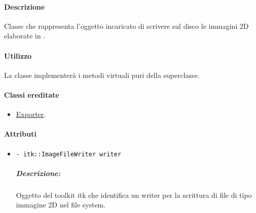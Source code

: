 \paragraph{Descrizione \\}
Classe che rappresenta l'oggetto incaricato di scrivere sul disco le immagini 2D elaborate in \project.
\paragraph{Utilizzo\\}
La classe implementerà i metodi virtuali puri della superclasse.
\paragraph{Classi ereditate\\}
\begin{itemize}
\item \hyperref[spexporter]{Exporter}.
\end{itemize}
\paragraph{\color{black}Attributi \\}
	\begin{itemize}
		\item \color{teal}\verb!- itk::ImageFileWriter writer!
		\color{black}
		\subparagraph{Descrizione:} Oggetto del toolkit itk che identifica un writer per la scrittura di file di tipo immagine 2D nel file system.
	\end{itemize}	
